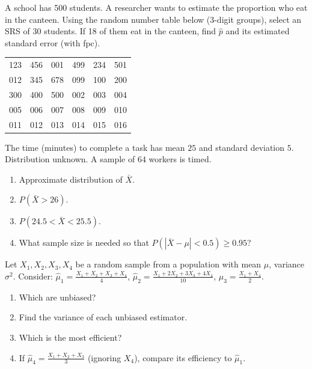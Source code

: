 \documentclass[11pt]{article}
\begin{document}
\begin{exercice}
A school has 500 students. A researcher wants to estimate the proportion who eat in the canteen. Using the random number table below (3-digit groups), select an SRS of 30 students. If 18 of them eat in the canteen, find $\hat{p}$ and its estimated standard error (with fpc).

\begin{center}
\begin{tabular}{cccccc}
123 & 456 & 001 & 499 & 234 & 501 \\
012 & 345 & 678 & 099 & 100 & 200 \\
300 & 400 & 500 & 002 & 003 & 004 \\
005 & 006 & 007 & 008 & 009 & 010 \\
011 & 012 & 013 & 014 & 015 & 016 \\
\end{tabular}
\end{center}
\end{exercice}

\begin{exercice}
The time (minutes) to complete a task has mean $25$ and standard deviation $5$. Distribution unknown. A sample of $64$ workers is timed.
\begin{enumerate}
\item Approximate distribution of $\bar{X}$.
\item $P(\bar{X} > 26)$.
\item $P(24.5 < \bar{X} < 25.5)$.
\item What sample size is needed so that $P(|\bar{X}-\mu| < 0.5) \ge 0.95$?
\end{enumerate}
\end{exercice}

\begin{exercice}
Let $X_1,X_2,X_3,X_4$ be a random sample from a population with mean $\mu$, variance $\sigma^2$. Consider:
$\hat{\mu}_1 = \frac{X_1+X_2+X_3+X_4}{4}$,
$\hat{\mu}_2 = \frac{X_1+2X_2+3X_3+4X_4}{10}$,
$\hat{\mu}_3 = \frac{X_1+X_4}{2}$.
\begin{enumerate}
\item Which are unbiased?
\item Find the variance of each unbiased estimator.
\item Which is the most efficient?
\item If $\hat{\mu}_4 = \frac{X_1+X_2+X_3}{3}$ (ignoring $X_4$), compare its efficiency to $\hat{\mu}_1$.
\end{enumerate}
\end{exercice}
\end{document}
